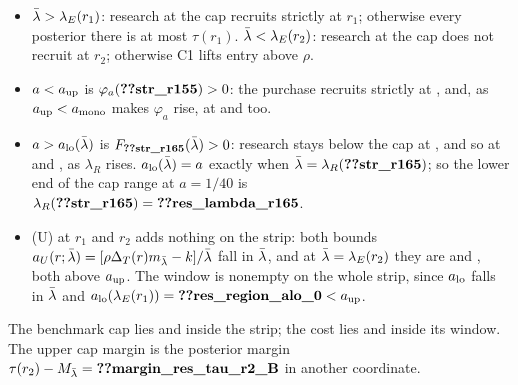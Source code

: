 \begin{itemize}[leftmargin=2em]
\item \(\bar\lambda>\lambda_E(r_1)\): research at the cap recruits strictly at \(r_1\); otherwise every posterior there is at most
\(\tau(r_1)\). \(\bar\lambda<\lambda_E(r_2)\): research at the cap does not recruit at \(r_2\); otherwise C1 lifts entry above \(\rho\).
\item \(a<a_{\rm up}\) is \(\varphi_a(\reg{str_r155})>0\): the purchase recruits strictly at , and, as \(a_{\rm up}<a_{\rm mono}\) makes
\(\varphi_a\) rise, at  and  too.
\item \(a>a_{\rm lo}(\bar\lambda)\) is \(F_{\reg{str_r165}}(\lb)>0\): research stays below the cap at , and so at  and , as
\(\lambda_R\) rises. \(a_{\rm lo}(\bar\lambda)=a\) exactly when \(\lb=\lambda_R(\reg{str_r165})\); so the lower end of the cap range at
\(a=1/40\) is \(\lambda_R(\reg{str_r165})=\reg{res_lambda_r165}\).
\item (U) at \(r_1\) and \(r_2\) adds nothing on the strip: both bounds \(a_U(r;\bar\lambda)=[\rho\Delta_T(r)m_{\bar\lambda}-k]/\bar\lambda\) fall in
\(\bar\lambda\), and at \(\bar\lambda=\lambda_E(r_2)\) they are  and , both above
\(a_{\rm up}\). The window is nonempty on the whole strip, since \(a_{\rm lo}\) falls in \(\bar\lambda\) and
\(a_{\rm lo}(\lambda_E(r_1))=\reg{res_region_alo_0}<a_{\rm up}\).
\end{itemize}
The benchmark cap lies  and  inside the strip; the cost lies
 and  inside its window. The upper cap margin is the posterior margin
\(\tau(r_2)-M_{\lb}=\reg{margin_res_tau_r2_B}\) in another coordinate.

